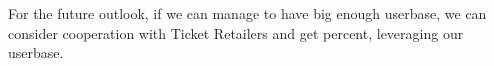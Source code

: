 \documentclass{article}
\begin{document}
For the future outlook, if we can manage to have big enough userbase, we can consider cooperation with Ticket Retailers and get percent, leveraging our userbase.


\vspace{3mm}






\end{document}
